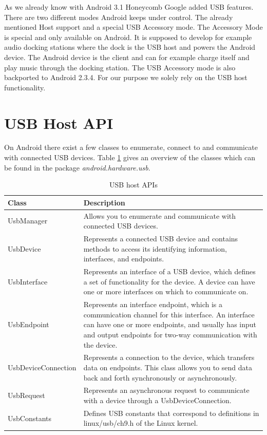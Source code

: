 As we already know with Android 3.1 Honeycomb Google added USB features. There are two different modes Android keeps under control. The already mentioned Host support and a special USB Accessory mode\cite{android_usb_accessory}. The Accessory Mode is special and only available on Android. It is supposed to develop for example audio docking stations where the dock is the USB host and powers the Android device. The Android device is the client and can for example charge itself and play music through the docking station. The USB Accessory mode is also backported to Android 2.3.4\cite{android_usb_accessory}. For our purpose we solely rely on the USB host functionality.

\section{USB Host API}

On Android there exist a few classes to enumerate, connect to and communicate with connected USB devices. Table \ref{table:host_api} gives an overview of the classes which can be found in the package \textit{android.hardware.usb}.

\begin{table}[ht]
\caption{USB host APIs \cite{android_usb_host}}
\centering
\begin{tabular}{|l|p{10cm}|}
\hline\hline
\textbf{Class} & \textbf{Description} \\ \hline
UsbManager & Allows you to enumerate and communicate with connected USB devices. \\ \hline
UsbDevice & Represents a connected USB device and contains methods to access its identifying information, interfaces, and endpoints. \\ \hline
UsbInterface & Represents an interface of a USB device, which defines a set of functionality for the device. A device can have one or more interfaces on which to communicate on. \\ \hline
UsbEndpoint & Represents an interface endpoint, which is a communication channel for this interface. An interface can have one or more endpoints, and usually has input and output endpoints for two-way communication with the device. \\ \hline
UsbDeviceConnection & Represents a connection to the device, which transfers data on endpoints. This class allows you to send data back and forth synchronously or asynchronously. \\ \hline
UsbRequest & Represents an asynchronous request to communicate with a device through a UsbDeviceConnection. \\ \hline
UsbConstants & Defines USB constants that correspond to definitions in linux/usb/ch9.h of the Linux kernel. \\ \hline
\end{tabular}
\label{table:host_api}
\end{table}

